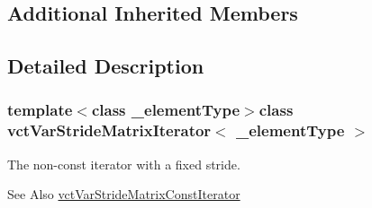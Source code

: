 \subsection*{Additional Inherited Members}


\subsection{Detailed Description}
\subsubsection*{template$<$class \-\_\-element\-Type$>$class vct\-Var\-Stride\-Matrix\-Iterator$<$ \-\_\-element\-Type $>$}

The non-\/const iterator with a fixed stride. \begin{DoxySeeAlso}{See Also}
\hyperlink{classvct_var_stride_matrix_const_iterator}{vct\-Var\-Stride\-Matrix\-Const\-Iterator} 
\end{DoxySeeAlso}


